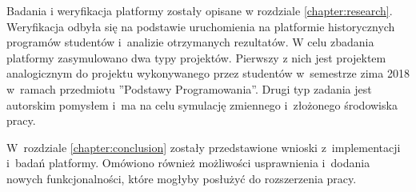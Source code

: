 Badania i weryfikacja platformy zostały opisane w rozdziale \ref{chapter:research}.
Weryfikacja odbyła się na podstawie uruchomienia na platformie historycznych programów studentów i~analizie otrzymanych rezultatów.
W celu zbadania platformy zasymulowano dwa typy projektów.
Pierwszy z nich jest projektem analogicznym do projektu wykonywanego przez studentów w~semestrze zima 2018 w~ramach przedmiotu ”Podstawy Programowania”.
Drugi typ zadania jest autorskim pomysłem i~ma na celu symulację zmiennego i~złożonego środowiska pracy.

W~rozdziale \ref{chapter:conclusion} zostały przedstawione wnioski z~implementacji i~badań platformy.
Omówiono również możliwości usprawnienia i~dodania nowych funkcjonalności, które mogłyby posłużyć do rozszerzenia pracy.





